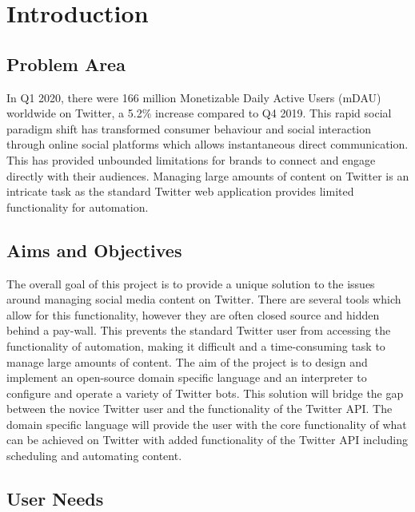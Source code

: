 \renewcommand{\chaptername}{}

\chapter{Introduction}

\section{Problem Area}

In Q1 2020, there were 166 million Monetizable Daily Active Users (mDAU) worldwide on Twitter, a 5.2\% increase compared to Q4 2019. This rapid social paradigm shift has transformed consumer behaviour and social interaction through online social platforms which allows instantaneous direct communication. This has provided unbounded limitations for brands to connect and engage directly with their audiences. Managing large amounts of content on Twitter is an intricate task as the standard Twitter web application provides limited functionality for automation.

\section{Aims and Objectives}

The overall goal of this project is to provide a unique solution to the issues around managing social media content on Twitter. There are several tools which allow for this functionality, however they are often closed source and hidden behind a pay-wall. This prevents the standard Twitter user from accessing the functionality of automation, making it difficult and a time-consuming task to manage large amounts of content. The aim of the project is to design and implement an open-source domain specific language and an interpreter to configure and operate a variety of Twitter bots. This solution will bridge the gap between the novice Twitter user and the functionality of the Twitter API. The domain specific language will provide the user with the core functionality of what can be achieved on Twitter with added functionality of the Twitter API including scheduling and automating content.

\section{User Needs}

